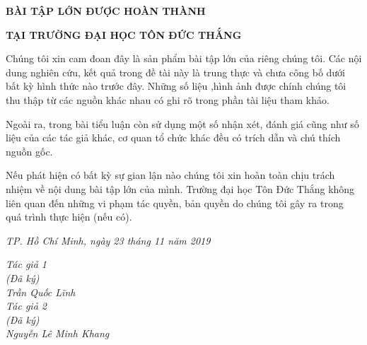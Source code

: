 \newpage
\changefontsizes{16pt}
\centerline{\textbf{BÀI TẬP LỚN ĐƯỢC HOÀN THÀNH}}
\centerline{\textbf{TẠI TRƯỜNG ĐẠI HỌC TÔN ĐỨC THẮNG}}
\changefontsizes{13pt}
\vspace{1cm}
\setlength{\parindent}{2cm}
Chúng tôi xin cam đoan đây là sản phẩm bài tập lớn của riêng chúng tôi. Các nội dung nghiên cứu, kết quả trong đề tài này là trung thực và chưa công bố dưới bất kỳ hình thức nào trước đây. Những số liệu ,hình ảnh được chính chúng tôi thu thập từ các nguồn khác nhau có ghi rõ trong phần tài liệu tham khảo.

\setlength{\parindent}{2cm}
Ngoài ra, trong bài tiểu luận còn sử dụng một số nhận xét, đánh giá cũng như số liệu của các tác giả khác, cơ quan tổ chức khác đều có trích dẫn và chú thích nguồn gốc.

\setlength{\parindent}{2cm}
Nếu phát hiện có bất kỳ sự gian lận nào chúng tôi xin hoàn toàn chịu trách nhiệm về nội dung bài tập lớn của mình. Trường đại học Tôn Đức Thắng không liên quan đến những vi phạm tác quyền, bản quyền do chúng tôi gây ra trong quá trình thực hiện (nếu có).

\vspace{0.75cm}
\begin{flushright}
\renewcommand{\baselinestretch}{0.05}
\changefontsizes{13pt}
\textit{TP. Hồ Chí Minh, ngày 23 tháng 11 năm 2019}
\end{flushright}

\setlength{\parindent}{12.5cm}
\textit{Tác giả 1}\\

\setlength{\parindent}{12.5cm}
\textit{(Đã ký)}\\

\setlength{\parindent}{12cm}
\textit{Trần Quốc Lĩnh}\\

\setlength{\parindent}{12.5cm}
\textit{Tác giả 2}\\

\setlength{\parindent}{12.5cm}
\textit{(Đã ký)}\\

\setlength{\parindent}{11cm}
\textit{Nguyễn Lê Minh Khang}\\
